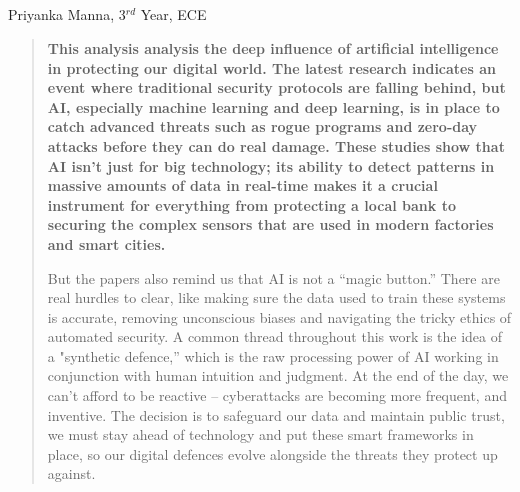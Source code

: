 \begin{center}
  \section{}
  Priyanka Manna, 3$^{rd}$ Year, ECE
\end{center}

\setcounter{figure}{0}

\begin{multicols}{2}
  \begin{abstract}
    \bfseries
    This analysis analysis the deep influence of artificial intelligence in protecting our digital world. The latest research indicates an event where traditional security protocols are falling behind, but AI, especially machine learning and deep learning, is in place to catch advanced threats such as rogue programs and zero-day attacks before they can do real damage. These studies show that AI isn’t just for big technology; its ability to detect patterns in massive amounts of data in real-time makes it a crucial instrument for everything from protecting a local bank to securing the complex sensors that are used in modern factories and smart cities.

    \noindent
    But the papers also remind us that AI is not a “magic button.” There are real hurdles to clear, like making sure the data used to train these systems is accurate, removing unconscious biases and navigating the tricky ethics of automated security. A common thread throughout this work is the idea of a "synthetic defence,” which is the raw processing power of AI working in conjunction with human intuition and judgment. At the end of the day, we can’t afford to be reactive – cyberattacks are becoming more frequent, and inventive. The decision is to safeguard our data and maintain public trust, we must stay ahead of technology and put these smart frameworks in place, so our digital defences evolve alongside the threats they protect up against.

  \end{abstract}


\end{multicols}
